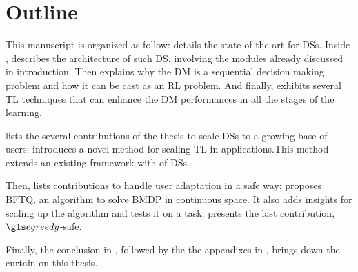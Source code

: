 \printbibliography[keyword={me},heading=none]

\section{Outline}


This manuscript is organized as follow:  details the state of the art for  \glspl{DS}. Inside ,  describes the architecture of such \gls{DS}, involving the modules already discussed in introduction. Then  explains why the \gls{DM} is a sequential decision making problem and how it can be cast as an \gls{RL} problem. And finally,  exhibits several \gls{TL} techniques that can enhance the \gls{DM} performances in all the stages of the learning.

 lists the several contributions of the thesis to scale \glspl{DS} to a growing base of users:  introduces a novel method for scaling \gls{TL} in  applications.This method extends an existing framework with  of \glspl{DS}.

Then,  lists contributions to handle user adaptation in a safe way:   proposes \gls{BFTQ}, an algorithm to solve \gls{BMDP} in continuous space. It also adds insights for scaling up the algorithm and tests it on a  task;  presents the last contribution, $\egreedy$-safe.

Finally, the conclusion in , followed by the the appendixes in , brings down the curtain on this thesis.